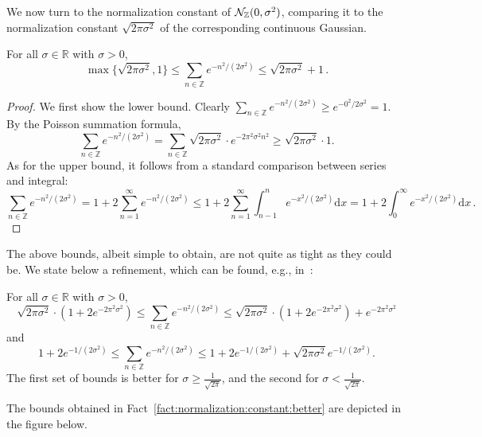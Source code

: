\documentclass{jpc}
\newcommand{\dx}[1][x]{\mathrm{d}#1}
\newcommand{\Z}{\mathbb{Z}}
\newcommand{\R}{\mathbb{R}}
\begin{document}
We now turn to the normalization constant of $\discN(0,\sigma^2)$, comparing it to the normalization constant $\sqrt{2\pi\sigma^2}$ of the corresponding continuous Gaussian.
\begin{fact}\label{fact:normalization:constant}
    For all $\sigma \in \R$ with $\sigma>0$,
    \begin{equation}
        \max\{ \sqrt{2\pi\sigma^2} , 1\}
        \leq \sum_{n\in\Z} e^{-n^2/(2\sigma^2)} 
        \leq \sqrt{2\pi\sigma^2} + 1\,.
    \end{equation}
\end{fact}
\begin{proof}
We first show the lower bound. Clearly $\sum_{n\in\Z} e^{-n^2/(2\sigma^2)} \ge e^{-0^2/2\sigma^2}=1$. By the Poisson summation formula,
\[
        \sum_{n\in\Z} e^{-n^2/(2\sigma^2)} 
        = \sum_{n\in\Z} \sqrt{2\pi\sigma^2} \cdot e^{-2\pi^2\sigma^2n^2} 
        \geq \sqrt{2\pi\sigma^2} \cdot 1.
\]
As for the upper bound, it follows from a standard comparison between series and integral:
\[
        \sum_{n\in\Z} e^{-n^2/(2\sigma^2)} 
        = 1+ 2\sum_{n=1}^\infty e^{-n^2/(2\sigma^2)}
        \leq 1+ 2\sum_{n=1}^\infty \int_{n-1}^n e^{-x^2/(2\sigma^2)} \dx 
        = 1+ 2\int_{0}^\infty e^{-x^2/(2\sigma^2)} \dx\,. 
\]
\end{proof}
The above bounds, albeit simple to obtain, are not quite as tight as they could be. We state below a refinement, which can be found, e.g., in~\cite[Claim~2.8.1]{Stephens-Davidowitz17}:
\begin{fact}\label{fact:normalization:constant:better}
    For all $\sigma \in \R$ with $\sigma>0$,
    \begin{equation}
        \sqrt{2\pi\sigma^2} \cdot (1+2e^{-2\pi^2\sigma^2}) 
            \leq \sum_{n\in\Z} e^{-n^2/(2\sigma^2)} 
            \leq \sqrt{2\pi\sigma^2} \cdot (1+2e^{-2\pi^2\sigma^2}) + e^{-2\pi^2\sigma^2}
    \end{equation}
    and
    \begin{equation}
        1+2e^{-1/(2\sigma^2)}
            \leq \sum_{n\in\Z} e^{-n^2/(2\sigma^2)} 
            \leq 1+2e^{-1/(2\sigma^2)} + \sqrt{2\pi\sigma^2} e^{-1/(2\sigma^2)}.
    \end{equation}
    The first set of bounds is better for $\sigma \geq \frac{1}{\sqrt{2\pi}}$, and the second for $\sigma < \frac{1}{\sqrt{2\pi}}$.
\end{fact}
\noindent The bounds obtained in Fact~\ref{fact:normalization:constant:better} are depicted in the figure below.
\end{document}

